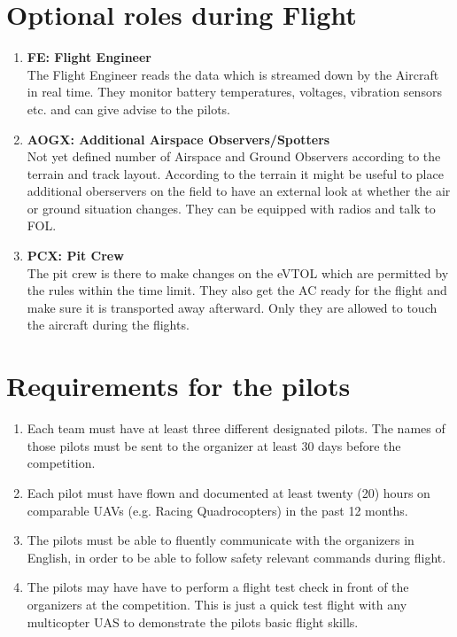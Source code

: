     \section{Optional roles during Flight}
    \begin{enumerate}
      \item \textbf{FE: Flight Engineer}\\The Flight Engineer reads the data which is streamed down by the Aircraft in real time. They monitor battery temperatures, voltages, vibration sensors etc. and can give advise to the pilots.
      \item \textbf{AOGX: Additional Airspace Observers/Spotters}\\Not yet defined number of Airspace and Ground Observers according to the terrain and track layout.
      According to the terrain it might be useful to place additional oberservers on the field to have an external look at whether the air or ground situation changes. They can be equipped with radios and talk to FOL.
      \item \textbf{PCX: Pit Crew }\\The pit crew is there to make changes on the eVTOL which are permitted by the rules within the time limit. They also get the AC ready for the flight and make sure it is transported away afterward. Only they are allowed to touch the aircraft during the flights. 
    \end{enumerate}

    \section{Requirements for the pilots}
    \begin{enumerate}
      \item Each team must have at least three different designated pilots. The names of those pilots must be sent to the organizer at least 
      30 days before the competition. 
      \item Each pilot must have flown and documented at least twenty (20) hours on comparable UAVs (e.g. Racing Quadrocopters) in the past 12 months.  
      \item The pilots must be able to fluently communicate with the organizers in English, in order to be able to follow safety relevant commands during flight.
      \item The pilots may have have to perform a flight test check in front of the organizers at the competition. This is just a quick test flight with any multicopter UAS to demonstrate the pilots basic flight skills.
    \end{enumerate}


